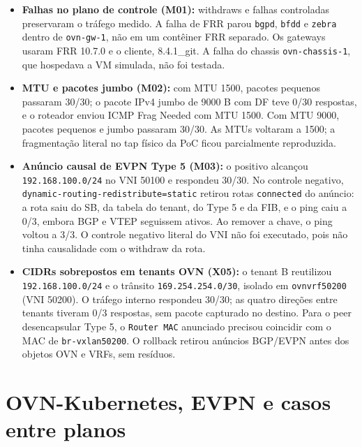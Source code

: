 \documentclass[12pt,openany,oneside,a4paper,chapter=TITLE,english,brazil]{abntex2}
\providecommand{\tightlist}{\setlength{\itemsep}{0pt}\setlength{\parskip}{0pt}}
\begin{document}
\begin{itemize}
\tightlist
\item
  \textbf{Falhas no plano de controle (M01):} withdraws e falhas controladas preservaram o tráfego medido. A falha de FRR parou \texttt{bgpd}, \texttt{bfdd} e \texttt{zebra} dentro de \texttt{ovn-{}\allowbreak{}gw-{}\allowbreak{}1}, não em um contêiner FRR separado. Os gateways usaram FRR 10.7.0 e o cliente, 8.4.1\_git. A falha do chassis \texttt{ovn-{}\allowbreak{}chassis-{}\allowbreak{}1}, que hospedava a VM simulada, não foi testada.
\item
  \textbf{MTU e pacotes jumbo (M02):} com MTU 1500, pacotes pequenos passaram 30/30; o pacote IPv4 jumbo de 9000 B com DF teve 0/30 respostas, e o roteador enviou ICMP Frag Needed com MTU 1500. Com MTU 9000, pacotes pequenos e jumbo passaram 30/30. As MTUs voltaram a 1500; a fragmentação literal no tap físico da PoC ficou parcialmente reproduzida.
\item
  \textbf{Anúncio causal de EVPN Type 5 (M03):} o positivo alcançou \texttt{192.\allowbreak{}168.\allowbreak{}100.\allowbreak{}0/\allowbreak{}24} no VNI 50100 e respondeu 30/30. No controle negativo, \texttt{dynamic-{}\allowbreak{}routing-{}\allowbreak{}redistribute=\allowbreak{}static} retirou rotas \texttt{connected} do anúncio: a rota saiu do SB, da tabela do tenant, do Type 5 e da FIB, e o ping caiu a 0/3, embora BGP e VTEP seguissem ativos. Ao remover a chave, o ping voltou a 3/3. O controle negativo literal do VNI não foi executado, pois não tinha causalidade com o withdraw da rota.
\item
  \textbf{CIDRs sobrepostos em tenants OVN (X05):} o tenant B reutilizou \texttt{192.\allowbreak{}168.\allowbreak{}100.\allowbreak{}0/\allowbreak{}24} e o trânsito \texttt{169.\allowbreak{}254.\allowbreak{}254.\allowbreak{}0/\allowbreak{}30}, isolado em \texttt{ovnvrf50200} (VNI 50200). O tráfego interno respondeu 30/30; as quatro direções entre tenants tiveram 0/3 respostas, sem pacote capturado no destino. Para o peer desencapsular Type 5, o \texttt{Router MAC} anunciado precisou coincidir com o MAC de \texttt{br-{}\allowbreak{}vxlan50200}. O rollback retirou anúncios BGP/EVPN antes dos objetos OVN e VRFs, sem resíduos.
\end{itemize}

\section{OVN-Kubernetes, EVPN e casos entre planos}\label{ovn-kubernetes-evpn-e-casos-entre-planos}
\end{document}
